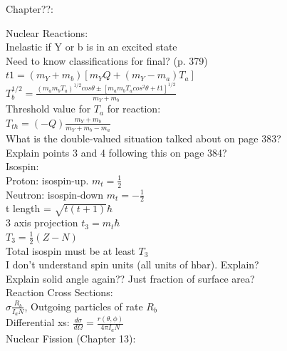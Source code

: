 \documentclass{article}
\begin{document}
\begin{multicols}{3}
Chapter??:

Nuclear Reactions:\\
Inelastic if Y or b is in an excited state\\
Need to know classifications for final? (p. 379)\\
$t1 =  (m_{Y}+m_{b})[m_{Y}Q + (m_{Y}-m_{a})T_{a}]$
$T_{b}^{1/2} = \frac{(m_{a}m_{b}T_{a})^{1/2}cos\theta \pm [ m_{a}m_{b}T_{a}cos^{2}\theta + t1 ]^{1/2}}{m_{Y} + m_{b}}$\\
Threshold value for $T_{a}$ for reaction:\\
\hspace*{0.01\textwidth} $T_{th} = (-Q)\frac{m_{Y} + m_{b}}{m_{Y}+m_{b}-m_{a}}$\\
What is the double-valued situation talked about on page 383?\\
Explain points 3 and 4 following this on page 384?\\
Isospin:\\
\hspace*{0.01\textwidth} Proton: isospin-up. $m_{t} = \frac{1}{2}$\\
\hspace*{0.01\textwidth} Neutron: isospin-down $m_{t} = -\frac{1}{2}$\\
\hspace*{0.01\textwidth} t length = $\sqrt{t(t+1)}\hbar$\\
\hspace*{0.01\textwidth} 3 axis projection $t_{3} = m_{t}\hbar$\\
\hspace*{0.01\textwidth} $T_{3} = \frac{1}{2} (Z-N)$\\
\hspace*{0.01\textwidth} Total isospin must be at least $T_{3}$\\
I don't understand spin units (all units of hbar).  Explain?\\
Explain solid angle again?? Just fraction of surface area?\\

Reaction Cross Sections:\\
$\sigma \frac{R_{b}}{I_{a}N}$, Outgoing particles of rate $R_{b}$\\
Differential xs: $\frac{d\sigma}{d\Omega} = \frac{r(\theta,\phi)}{4\pi I_{a} N}$\\


Nuclear Fission (Chapter 13):\\


\end{multicols}
\end{document}
